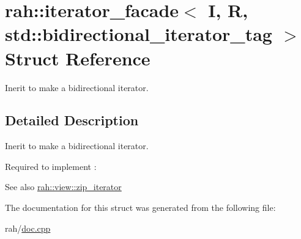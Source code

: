 \hypertarget{structrah_1_1iterator__facade_3_01_i_00_01_r_00_01std_1_1bidirectional__iterator__tag_01_4}{}\section{rah\+::iterator\+\_\+facade$<$ I, R, std\+::bidirectional\+\_\+iterator\+\_\+tag $>$ Struct Reference}
\label{structrah_1_1iterator__facade_3_01_i_00_01_r_00_01std_1_1bidirectional__iterator__tag_01_4}


Inerit to make a bidirectional iterator.  




\subsection{Detailed Description}
Inerit to make a bidirectional iterator. 

Required to implement \+: 
\begin{DoxyCode}{0}
\end{DoxyCode}
 \begin{DoxySeeAlso}{See also}
\mbox{\hyperlink{structrah_1_1view_1_1zip__iterator}{rah\+::view\+::zip\+\_\+iterator}} 
\end{DoxySeeAlso}


The documentation for this struct was generated from the following file\+:\begin{DoxyCompactItemize}
\item 
rah/\mbox{\hyperlink{doc_8cpp}{doc.\+cpp}}\end{DoxyCompactItemize}
